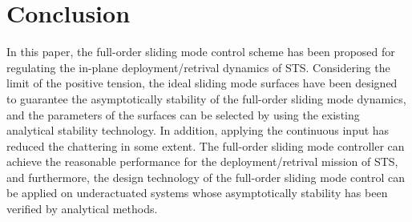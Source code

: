 \documentclass[conference]{IEEEtran}
\theoremstyle{plain}
\begin{document}
\section{Conclusion}
In this paper, the full-order sliding mode control scheme has been proposed for regulating the in-plane deployment/retrival dynamics of STS. Considering the limit of the positive tension, the ideal sliding mode surfaces have been designed to guarantee the asymptotically stability of the full-order sliding mode dynamics, and the parameters of the surfaces can be selected by using the existing analytical stability technology. In addition, applying the continuous input has reduced the chattering in some extent. The full-order sliding mode controller can achieve the reasonable performance for the deployment/retrival mission of STS, and furthermore, the design technology of the full-order sliding mode control can be applied on underactuated systems whose asymptotically stability has been verified by analytical methods.

%
%



%
%
\end{document}
